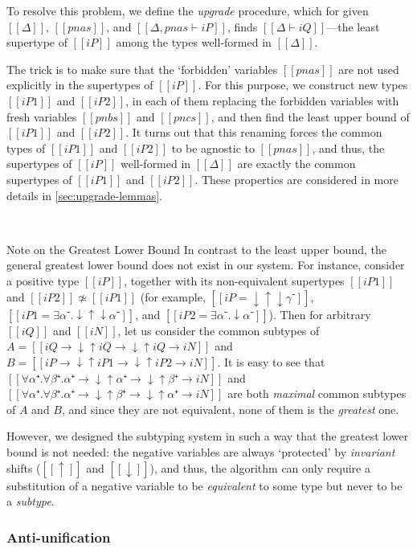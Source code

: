 To resolve this problem, we define the \emph{upgrade} procedure,
which for given $[[Δ]]$, $[[pnas]]$, and $[[Δ, pnas ⊢ iP]]$,
finds $[[Δ ⊢ iQ]]$---the least supertype of $[[iP]]$ 
among the types well-formed in $[[Δ]]$.

The trick is to make sure that the `forbidden' variables
$[[pnas]]$ are not used explicitly in the supertypes
of $[[iP]]$. For this purpose, we
construct new types $[[iP1]]$ and $[[iP2]]$,
in each of them replacing the forbidden variables
with fresh variables $[[pnbs]]$ and $[[pncs]]$,
and then find the least upper bound of $[[iP1]]$ and $[[iP2]]$.
It turns out that this renaming forces the common types of 
$[[iP1]]$ and $[[iP2]]$ to be agnostic to $[[pnas]]$,
and thus, the supertypes of $[[iP]]$ well-formed in $[[Δ]]$
are exactly the common supertypes of $[[iP1]]$ and $[[iP2]]$.
These properties are considered in more details in \cref{sec:upgrade-lemmas}.

\begin{algorithm}
  \hfill\\
  \ottdefnLUBUpLabeled[\apppref]{}
\end{algorithm}

\begin{paragraph}{Note on the Greatest Lower Bound}
  In contrast to the least upper bound, 
  the general greatest lower bound does not exist in our system.
  For instance, consider a positive type $[[iP]]$, 
  together with its non-equivalent
  supertypes $[[iP1]]$ and $[[iP2]] \not\simeq [[iP1]]$
  (for example, $[[iP = ↓↑↓γ⁻]]$, $[[iP1 = ∃α⁻.↓↑↓α⁻]]$, 
  and $[[iP2 = ∃α⁻.↓α⁻]]$).
  Then for arbitrary $[[iQ]]$ and $[[iN]]$, 
  let us consider the common subtypes of 
  $A = [[iQ → ↓↑iQ → ↓↑iQ → iN]]$ and $B = [[iP → ↓↑iP1 → ↓↑iP2 → iN]]$.
  It is easy to see that $[[∀α⁺.∀β⁺. α⁺ → ↓↑α⁺ → ↓↑β⁺ → iN]]$ and 
  $[[∀α⁺.∀β⁺. α⁺ → ↓↑β⁺ → ↓↑α⁺ → iN]]$ are
  both \emph{maximal} common subtypes of $A$ and $B$,
  and since they are not equivalent, none of them is 
  the \emph{greatest} one.

  However, we designed the subtyping system in such a way 
  that the greatest lower bound is not needed:
  the negative variables are always `protected'
  by \emph{invariant} shifts ($[[↑]]$ and $[[↓]]$), 
  and thus, the algorithm can only require
  a substitution of a negative variable to be 
  \emph{equivalent} to some type but never 
  to be a \emph{subtype}.
\end{paragraph}

\subsubsection{Anti-unification}
\label{sec:a:antiunification}

